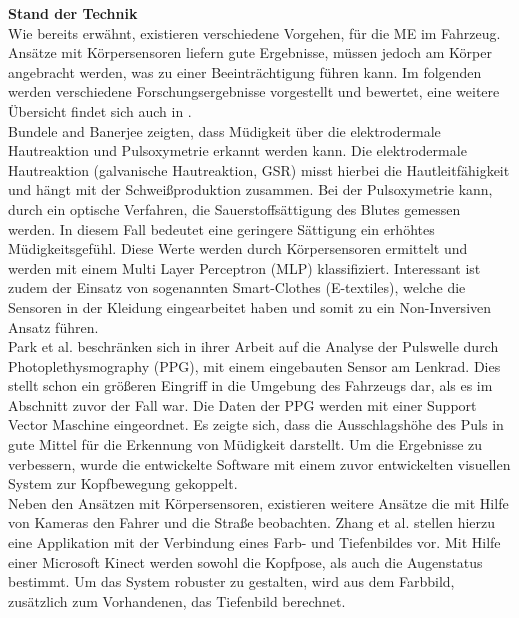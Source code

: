{\textbf{Stand der Technik} \\
Wie bereits erwähnt, existieren verschiedene Vorgehen, für die \acl{ME} im Fahrzeug. Ansätze mit Körpersensoren liefern gute Ergebnisse, müssen jedoch am Körper angebracht werden, was zu einer Beeinträchtigung führen kann. Im folgenden werden verschiedene Forschungsergebnisse vorgestellt und bewertet, eine weitere Übersicht findet sich auch in \cite{Sahayadhas_121216937}.\\

Bundele and Banerjee \citep{Bundele:2009:DFV:1806338.1806478} zeigten, dass Müdigkeit über die elektrodermale Hautreaktion und Pulsoxymetrie erkannt werden kann. Die elektrodermale Hautreaktion (galvanische Hautreaktion, GSR) misst hierbei die Hautleitfähigkeit und hängt mit der Schweißproduktion zusammen. Bei der Pulsoxymetrie kann, durch ein optische Verfahren, die Sauerstoffsättigung des Blutes gemessen werden. In diesem Fall bedeutet eine geringere Sättigung ein erhöhtes Müdigkeitsgefühl. Diese Werte werden durch Körpersensoren ermittelt und werden mit einem Multi Layer Perceptron (MLP) klassifiziert. Interessant ist zudem der Einsatz von sogenannten Smart-Clothes (E-textiles), welche die Sensoren in der Kleidung eingearbeitet haben und somit zu ein Non-Inversiven Ansatz führen.\\

Park et al. \cite{Park:2009:DDD:1667780.1667798} beschränken sich in ihrer Arbeit auf die Analyse der Pulswelle durch Photoplethysmography (PPG), mit einem eingebauten Sensor am Lenkrad. Dies stellt schon ein größeren Eingriff in die Umgebung des Fahrzeugs dar, als es im Abschnitt zuvor der Fall war. Die Daten der PPG werden mit einer Support Vector Maschine eingeordnet. Es zeigte sich, dass die Ausschlagshöhe des Puls in gute Mittel für die Erkennung von Müdigkeit darstellt. Um die Ergebnisse zu verbessern, wurde die entwickelte Software mit einem zuvor entwickelten visuellen System zur Kopfbewegung gekoppelt. \\

Neben den Ansätzen mit Körpersensoren, existieren weitere Ansätze die mit Hilfe von Kameras den Fahrer und die Straße beobachten. Zhang et al. \cite{Zhang:2015:RSD:2753829.2629482} stellen hierzu eine Applikation mit der Verbindung eines Farb- und Tiefenbildes vor. Mit Hilfe einer Microsoft Kinect werden sowohl die Kopfpose, als auch die Augenstatus bestimmt. Um das System robuster zu gestalten, wird aus dem Farbbild,  zusätzlich zum Vorhandenen, das Tiefenbild berechnet.\\

}

